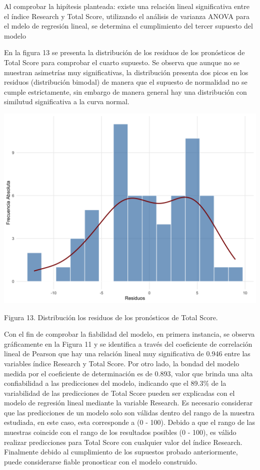 \documentclass[
]{article}
\begin{document}
\begin{multicols}{2}

Al comprobar la hipítesis planteada: existe una relación lineal significativa entre el índice Research y Total Score, utilizando el análisis de varianza ANOVA para el mdelo de regresión lineal, se determina el cumplimiento del tercer supuesto del modelo

En la figura 13 se presenta la distribución de los residuos de los pronósticos de Total Score para comprobar el cuarto supuesto. Se observa que aunque no se muestran asimetrías muy significativas, la distribución presenta dos picos en los residuos (distribución bimodal) de manera que el supuesto de normalidad no se cumple estrictamente, sin embargo de manera general hay una distribución con similutud significativa a la curva normal.


\begin{center}
\includegraphics[width=\linewidth]{figura13.png}
\end{center}

Figura 13. Distribución los residuos de los pronósticos de Total Score.




Con el fin de comprobar la fiabilidad del modelo, en primera instancia, se observa gráficamente en la Figura 11 y se identifica a través del coeficiente de correlación lineal de Pearson que hay una relación lineal muy significativa de 0.946 entre las variables índice Research y Total Score. Por otro lado, la bondad del modelo medida por el coeficiente de determinación es de 0.893, valor que brinda una alta confiabilidad a las predicciones del modelo, indicando que el 89.3\% de la variabilidad de las predicciones de Total Score pueden ser explicadas con el modelo de regresión lineal mediante la variable Research. Es necesario considerar que las predicciones de un modelo solo son válidas dentro del rango de la muestra estudiada, en este caso, esta corresponde a (0 - 100). Debido a que el rango de las muestras coincide con el rango de los resultados posibles (0 - 100), es válido realizar predicciones  para Total Score con cualquier valor del índice Research. Finalmente debido al cumplimiento de los supuestos probado anteriormente, puede considerarse fiable pronosticar con el modelo construido.


\end{multicols}
\end{document}
